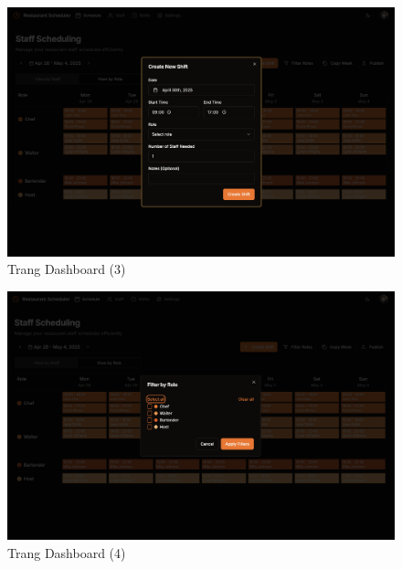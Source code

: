 \begin{figure}[H]
	\centering
	\includegraphics[width=15cm]{Sections/tong_quan/functional_spec/img/proto1.3.png}

     \vspace{0.5cm}
    \caption{Trang Dashboard (3)}
\end{figure}
\begin{figure}[H]
	\centering
	\includegraphics[width=15cm]{Sections/tong_quan/functional_spec/img/proto1.4.png}

     \vspace{0.5cm}
    \caption{Trang Dashboard (4)}
\end{figure}
